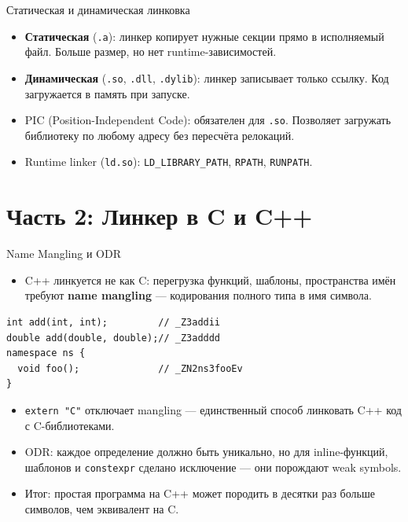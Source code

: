 \documentclass{beamer}
\begin{document}
\begin{frame}{Статическая и динамическая линковка}
\begin{itemize}
\item \textbf{Статическая} (\texttt{.a}): линкер копирует нужные секции прямо в
исполняемый файл. Больше размер, но нет runtime-зависимостей.
\item \textbf{Динамическая} (\texttt{.so}, \texttt{.dll}, \texttt{.dylib}):
линкер записывает только ссылку. Код загружается в память при запуске.
\item PIC (Position-Independent Code): обязателен для \texttt{.so}.
Позволяет загружать библиотеку по любому адресу без пересчёта релокаций.
\item Runtime linker (\texttt{ld.so}): \texttt{LD\_LIBRARY\_PATH},
\texttt{RPATH}, \texttt{RUNPATH}.
\end{itemize}
\end{frame}

\section{Часть 2: Линкер в C и C++}

\begin{frame}[fragile]{Name Mangling и ODR}
\begin{itemize}
\item C++ линкуется не как C: перегрузка функций, шаблоны, пространства имён
требуют \textbf{name mangling} — кодирования полного типа в имя символа.
\end{itemize}
\begin{lstlisting}
int add(int, int);         // _Z3addii
double add(double, double);// _Z3adddd
namespace ns {
  void foo();              // _ZN2ns3fooEv
}
\end{lstlisting}
\begin{itemize}
\item \texttt{extern "C"} отключает mangling — единственный способ
линковать C++ код с C-библиотеками.
\item ODR: каждое определение должно быть уникально, но для inline-функций,
шаблонов и \texttt{constexpr} сделано исключение — они порождают weak symbols.
\item Итог: простая программа на C++ может породить в десятки раз больше символов,
чем эквивалент на C.
\end{itemize}
\end{frame}
\end{document}
